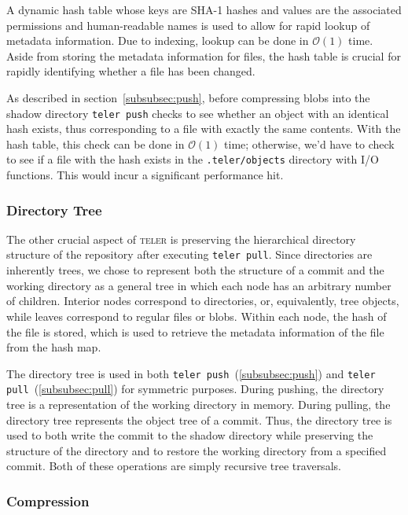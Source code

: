 \documentclass[12pt, letterpaper]{article}
\begin{document}
\begin{multicols}{2}
  A dynamic hash table whose keys are SHA-1 hashes and values are
  the associated permissions and human-readable names is used to allow
  for rapid lookup of metadata information. Due to indexing, lookup
  can be done in $\mathcal{O}(1)$ time. Aside from storing the
  metadata information for files, the hash table is crucial for rapidly
  identifying whether a file has been changed.

  As described in section~\ref{subsubsec:push}, before compressing
  blobs into the shadow directory \texttt{teler push} checks to see
  whether an object with an identical hash exists, thus corresponding
  to a file with exactly the same contents. With the hash table, this
  check can be done in $\mathcal{O}(1)$ time; otherwise, we'd have to
  check to see if a file with the hash exists in the
  \texttt{.teler/objects} directory with I/O functions. This would
  incur a significant performance hit.

  \subsubsection{Directory Tree}
  \label{subsubsec:tree}

  The other crucial aspect of \textsc{teler} is preserving
  the hierarchical directory structure of the repository after
  executing \texttt{teler pull}. Since directories are inherently
  trees, we chose to represent both the structure of a commit and the
  working directory as a general tree in which each node has an
  arbitrary number of children. Interior nodes correspond to
  directories, or, equivalently, tree objects, while leaves correspond
  to regular files or blobs. Within each node, the hash of the file is
  stored, which is used to retrieve the metadata information of the
  file from the hash map.

  The directory tree is used in both \texttt{teler
    push}~(\ref{subsubsec:push}) and \texttt{teler
    pull}~(\ref{subsubsec:pull}) for symmetric purposes. During
  pushing, the directory tree is a representation of the working
  directory in memory. During pulling, the directory tree
  represents the object tree of a commit. Thus, the directory tree is
  used to both write the commit to the shadow directory while
  preserving the structure of the directory and to restore the working
  directory from a specified commit. Both of these operations are
  simply recursive tree traversals.

  \subsubsection{Compression}
  \label{subsec:compression}


\end{multicols}
\end{document}
